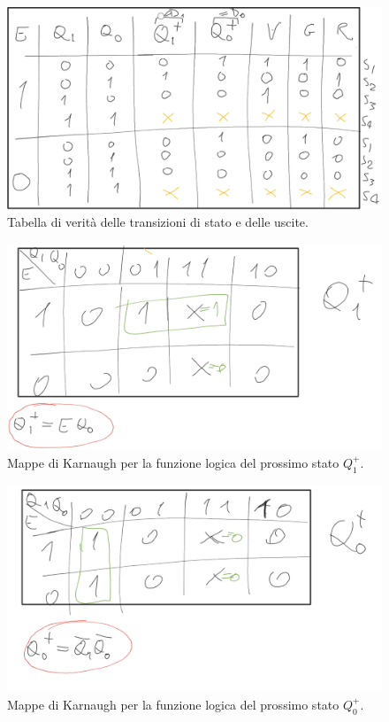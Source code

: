 \documentclass[10pt,a4paper]{article}
\begin{document}
\begin{figure}[htp]
    \begin{center}
    \includegraphics[scale=0.25]{fig2.png}
    \caption{Tabella di verità delle transizioni di stato e delle uscite.}
    \label{fig2}
    \end{center}
\end{figure}

\begin{figure}[htp]
    \begin{center}
    \includegraphics[scale=0.25]{fig3.png}
    \caption{Mappe di Karnaugh per la funzione logica del prossimo stato $Q_1^+$.}
    \label{fig3}
    \end{center}
\end{figure}

\begin{figure}
    \begin{center}
    \includegraphics[scale=0.25]{fig4.png}
    \caption{Mappe di Karnaugh per la funzione logica del prossimo stato $Q_0^+$.}
    \label{fig4}
    \end{center}
\end{figure}
\end{document}
